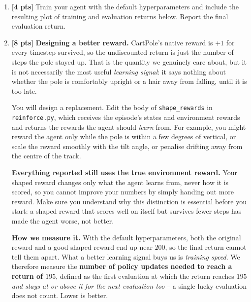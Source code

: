 \begin{enumerate}
    \item \textbf{[4 pts]} Train your agent with the default hyperparameters and
    include the resulting plot of training and evaluation returns below. Report
    the final evaluation return.

    \begin{tcolorbox}[fit,height=10cm, width=15cm, blank, borderline={1pt}{-2pt}]

    \end{tcolorbox}

    \clearpage

    \item \textbf{[8 pts]} \textbf{Designing a better reward.}
    CartPole's native reward is $+1$ for every timestep survived, so the
    undiscounted return is just the number of steps the pole stayed up. That is
    the quantity we genuinely care about, but it is not necessarily the most
    useful \emph{learning signal}: it says nothing about whether the pole is
    comfortably upright or a hair away from falling, until it is too late.

    You will design a replacement. Edit the body of \texttt{shape\_rewards} in
    \texttt{reinforce.py}, which receives the episode's states and environment
    rewards and returns the rewards the agent should \emph{learn} from. For
    example, you might reward the agent only while the pole is within a few
    degrees of vertical, or scale the reward smoothly with the tilt angle, or
    penalise drifting away from the centre of the track.

    \textbf{Everything reported still uses the true environment reward.} Your
    shaped reward changes only what the agent learns from, never how it is
    scored, so you cannot improve your numbers by simply handing out more
    reward. Make sure you understand why this distinction is essential before
    you start: a shaped reward that scores well on itself but survives fewer
    steps has made the agent worse, not better.

    \textbf{How we measure it.} With the default hyperparameters, both the original
    reward and a good shaped reward end up near $200$, so the final return
    cannot tell them apart. What a better learning signal buys us is
    \emph{training speed}. We therefore measure the \textbf{number of policy updates
    needed to reach a return of $195$}, defined as the first evaluation at which
    the return reaches $195$ \emph{and stays at or above it for the next
    evaluation too} -- a single lucky evaluation does not count. Lower is better.


\end{enumerate}
